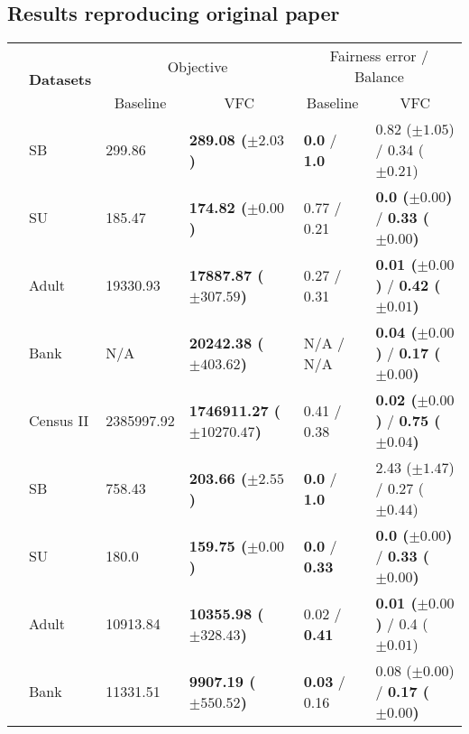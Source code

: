 \subsection{Results reproducing original paper}
\begin{table}[]
	\small
	\centering
	\begin{tabular}{|m{.3cm}|m{1.4cm}|m{1.5cm}|m{2.2cm}|m{1.4cm}|m{4.3cm}|}
		\hline
		& \multirow{2}{*}{\textbf{Datasets}} & \multicolumn{2}{c|}{Objective} 		& \multicolumn{2}{c|}{Fairness error / Balance} \\ \cline{3-6}
		&  			& \multicolumn{1}{c|}{Baseline} & \multicolumn{1}{c|}{VFC} 		& \multicolumn{1}{c|}{Baseline} & \multicolumn{1}{c|}{VFC} \\ \hline
		\multirow{5}{*}{\STAB{\rotatebox[origin=c]{90}{F $K$-medians}}}
		& SB        & 299.86       			& \textbf{289.08 ($\pm 2.03$)}          & \textbf{0.0} / \textbf{1.0} 	& 0.82 ($\pm 1.05$) / 0.34 ($\pm 0.21$) \\
		& SU 		& 185.47       			& \textbf{174.82 ($\pm 0.00$)}          & 0.77 / 0.21 					& \textbf{0.0 ($\pm 0.00$)} / \textbf{0.33 ($\pm 0.00$)} \\
		& Adult     & 19330.93     			& \textbf{17887.87 ($\pm 307.59$)}      & 0.27 / 0.31 					& \textbf{0.01 ($\pm 0.00$)} / \textbf{0.42 ($\pm 0.01$)} \\
		& Bank      & N/A          			& \textbf{20242.38 ($\pm 403.62$)}      & N/A / N/A 					& \textbf{0.04 ($\pm 0.00$)} / \textbf{0.17 ($\pm 0.00$)} \\
		& Census II & 2385997.92   			& \textbf{1746911.27 ($\pm 10270.47$)}  & 0.41 / 0.38 					& \textbf{0.02 ($\pm 0.00$)} / \textbf{0.75 ($\pm 0.04$)} \\\hline
		\multirow{5}{*}{\STAB{\rotatebox[origin=c]{90}{F $K$-means}}}
		& SB        & 758.43    			& \textbf{203.66 ($\pm 2.55$)}          & \textbf{0.0} / \textbf{1.0} 	& 2.43 ($\pm 1.47$) / 0.27 ($\pm 0.44$) \\
		& SU		& 180.0     			& \textbf{159.75 ($\pm 0.00$)}          & \textbf{0.0} / \textbf{0.33} 	& \textbf{0.0 ($\pm 0.00$)} / \textbf{0.33 ($\pm 0.00$)} \\
		& Adult     & 10913.84  			& \textbf{10355.98 ($\pm 328.43$)}      & 0.02 / \textbf{0.41} 			& \textbf{0.01 ($\pm 0.00$)} / 0.4 ($\pm 0.01$) \\
		& Bank      & 11331.51  			& \textbf{9907.19 ($\pm 550.52$)}       & \textbf{0.03} / 0.16 			& 0.08 ($\pm 0.00$) / \textbf{0.17 ($\pm 0.00$)} \\

\end{tabular}
\end{table}
